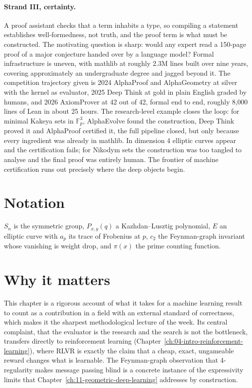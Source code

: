 \paragraph{Strand III, certainty.} A proof assistant checks that a term inhabits a type, so
compiling a statement establishes well-formedness, not truth, and the proof term is what must be
constructed. The motivating question is sharp: would any expert read a 150-page proof of a major
conjecture handed over by a language model? Formal infrastructure is
uneven, with mathlib at roughly 2.3M lines built over nine years, covering approximately an
undergraduate degree and jagged beyond it. The competition trajectory given is 2024 AlphaProof
and AlphaGeometry at silver with the kernel as evaluator, 2025 Deep Think at gold in plain
English graded by humans, and 2026 AxiomProver at 42 out of 42, formal end to end, roughly 8,000
lines of Lean in about 25 hours. The research-level example
closes the loop: for minimal Kakeya sets in $\mathbb{F}_p^3$, AlphaEvolve found the construction,
Deep Think proved it and AlphaProof certified it, the full pipeline closed, but only because every
ingredient was already in mathlib. In dimension 4 elliptic curves appear and the certification
fails; for Nikodym sets the construction was too tangled to analyse and the final proof was
entirely human. The frontier of machine certification runs out precisely where the deep objects
begin.

\section*{Notation}

$S_n$ is the symmetric group, $P_{x,y}(q)$ a Kazhdan--Lusztig polynomial, $E$ an elliptic curve
with $a_p$ its trace of Frobenius at $p$, $c_2$ the Feynman-graph invariant whose vanishing is
weight drop, and $\pi(x)$ the prime counting function.

\section*{Why it matters}

This chapter is a rigorous account of what it takes for a machine learning result to count as a
contribution in a field with an external standard of correctness, which makes it the sharpest
methodological lecture of the week. Its central complaint, that the evaluator is the research and
the search is not the bottleneck, transfers directly to reinforcement learning
(Chapter~\ref{ch:04-intro-reinforcement-learning}), where RLVR is exactly the claim that a
cheap, exact, ungameable reward changes what is learnable. The Feynman-graph observation that
4-regularity makes message passing blind is a concrete instance of the expressivity limits that
Chapter~\ref{ch:11-geometric-deep-learning} addresses by construction.

